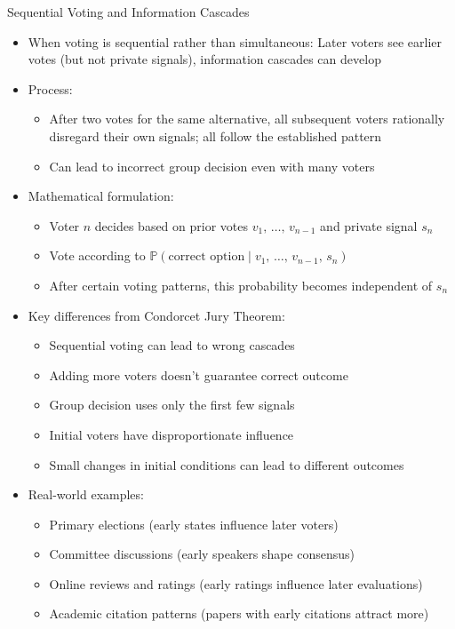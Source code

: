 \documentclass[10pt,handout]{beamer}
\begin{document}
\begin{frame}{Sequential Voting and Information Cascades}
  \begin{itemize}[<+->]
    \item When voting is sequential rather than simultaneous: Later voters see earlier votes (but not private signals), information cascades can develop
    \item Process:
      \begin{itemize}
        \item After two votes for the same alternative, all subsequent voters rationally disregard their own signals; all follow the established pattern
        \item Can lead to incorrect group decision even with many voters
      \end{itemize}
    \item Mathematical formulation:
      \begin{itemize}
        \item Voter $n$ decides based on prior votes $v_1,\,\ldots,\,v_{n-1}$ and private signal $s_n$
        \item Vote according to $\mathbb{P}(\text{correct option} \mid v_1,\,\ldots,\,v_{n-1},\,s_n)$
        \item After certain voting patterns, this probability becomes independent of $s_n$
      \end{itemize}
    \item Key differences from Condorcet Jury Theorem:
      \begin{itemize}
        \item Sequential voting can lead to wrong cascades
        \item Adding more voters doesn't guarantee correct outcome
        \item Group decision uses only the first few signals
        \item Initial voters have disproportionate influence
        \item Small changes in initial conditions can lead to different outcomes
      \end{itemize}
    \item Real-world examples:
      \begin{itemize}
        \item Primary elections (early states influence later voters)
        \item Committee discussions (early speakers shape consensus)
        \item Online reviews and ratings (early ratings influence later evaluations)
        \item Academic citation patterns (papers with early citations attract more)
      \end{itemize}
  \end{itemize}
\end{frame}
\end{document}
